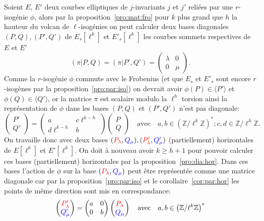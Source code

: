 \documentclass[10pt,a4paper]{book}
\theoremstyle{plain}
\theoremstyle{definition}
\theoremstyle{definition}
\theoremstyle{definition}
\theoremstyle{definition}
\theoremstyle{remark}
\theoremstyle{remark}
\theoremstyle{definition}
\begin{document}
Soient $E$, $E'$ deux courbes elliptiques de $j$-invariants $j$ et $j'$ reliées par une $r$-isogénie $\phi$, alors par la proposition~\ref{pro:mat:fro} pour $k$ plus grand que $h$ la hauteur du volcan de $\ell$-isogénies on peut calculer deux bases diagonales $(P,Q),(P',Q')$ de $E_s[\ell^k]$ et $E'_s[\ell^k]$ les courbes sommets respectives de $E$ et $E'$ 
\[
(\pi|P,Q)=(\pi|P',Q')= \left( \begin{matrix}
\lambda & 0 \\
0 & \mu
\end{matrix} \right).
\]
Comme la $r$-isogénie $\phi$ commute avec le Frobenius (et que $E_s$ et $E'_s$ sont encore $r$-isogènes par la proposition~\ref{pro:par:iso}) on devrait avoir $\phi(P) \in \langle P' \rangle $ et $\phi(Q) \in \langle Q' \rangle $, or la matrice $\pi$ est scalaire modulo la $\ell^{h}$ torsion ainsi la représentation de $\phi$ dans les bases $(P,Q)$ et $(P',Q')$ n'est pas diagonale:
\[
\left(
\begin{matrix}
P' \\
Q'
\end{matrix}
\right)=
\left( 
\begin{matrix}
a &  c\ell^{k-h} \\
d\ell^{k-h} & b
\end{matrix}
\right)
\left(
\begin{matrix}
P \\
Q
\end{matrix}
\right) \quad \text{avec} \quad a,b \in \left( \mathbb{Z}/\ell^k\mathbb{Z} \right)^*; c,d \in \mathbb{Z}/\ell^{h}\mathbb{Z}.
\]
 On travaille donc avec deux bases $(\color{red}P_{\lambda} \color{black},
 \color{blue}Q_{\mu}\color{black}),(\color{red}P'_{\lambda}\color{black},
 \color{blue}Q'_{\mu}\color{black})$ (partiellement) horizontales de 
 $E[\ell^k]$ et $E'[\ell^k]$.
 On doit à nouveau avoir $k \geqslant h +1$ pour pouvoir calculer ces bases 
(partiellement) horizontales par la proposition~\ref{pro:dia:hor}.
 Dans ces bases l'action de $\phi$ sur la base 
 $(\color{red}P_{\lambda} \color{black},\color{blue}Q_{\mu}\color{black})$ 
 peut être représentée comme une matrice diagonale car par la 
 proposition~\ref{pro:par:iso} et le corollaire~\ref{cor:par:hor} les points de
  même direction sont mis en correspondance:
\[
\left(
\begin{matrix}
\color{red} P'_{\lambda} \\
\color{blue} Q'_{\mu} \color{black}
\end{matrix}
\right)= \left(\begin{matrix}
a & 0 \\
0 & b
\end{matrix} \right)
\left(
\begin{matrix}
\color{red} P_{\lambda} \\
\color{blue} Q_{\mu} \color{black}
\end{matrix}
\right)
\quad \text{avec} \quad a,b \in \left( \mathbb{Z}/\ell^k\mathbb{Z} \right)^*
\]
\end{document}
